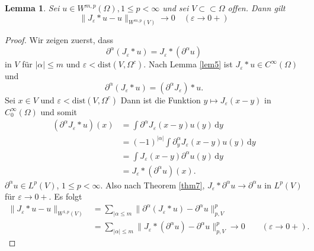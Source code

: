 \documentclass[
paper=a4,
bibtotocnumbered,
liststotocnumbered,
tablecaptionabove,
pointlessnumbers,
twoside,
openright,
10pt
]
{report}
\newtheorem{lem}[thm]{Lemma}
\theoremstyle{definition}
\numberwithin{equation}{chapter}
\begin{document}
\begin{lem}\label{2.6}
Sei $u\in W^{m,p}(\Omega), 1 \le p <\infty$ und sei $V\subset \subset \Omega$ offen. Dann gilt
$$
\| J_\varepsilon * u - u\|_{W^{m,p}(V)} \to 0 \quad (\varepsilon \rightarrow 0 +)
$$
\end{lem}
\begin{proof}
Wir zeigen zuerst, dass
$$
\partial^\alpha (J_\varepsilon * u) = J_\varepsilon * (\partial^\alpha u)
$$
in $V$ für $|\alpha|\le m$ und $\varepsilon < \text{dist} (V, \Omega^c)$. Nach Lemma \ref{lem5} ist $J_\varepsilon * u\in C^\infty(\Omega)$ und 
$$
\partial^\alpha (J_\varepsilon * u) = ( \partial^\alpha J_\varepsilon) * u.
$$
Sei $x\in V$ und $\varepsilon < \text{dist}(V, \Omega^c)$ Dann ist die Funktion 
$y\mapsto J_\varepsilon(x-y)$ in $C_0^\infty(\Omega)$ und somit 
\begin{align*}
(\partial^\alpha J_\varepsilon * u) (x)&= \int \partial^\alpha J_\varepsilon (x-y) u(y) \, \mathrm dy\\
&= (-1)^{|\alpha|} \int \partial_y^\alpha J_{\varepsilon} (x-y) u(y) \, \mathrm dy \\
&= \int J_\varepsilon (x-y) \partial^\alpha u(y) \, \mathrm dy \\
&= J_\varepsilon * (\partial^\alpha u) (x).
\end{align*}
$\partial^\alpha u \in L^p(V)$, $1\le p <\infty$. Also nach Theorem \ref{thm7}, $J_\varepsilon * \partial^\alpha u \to \partial^\alpha u$ in $L^p(V)$  für $\varepsilon \to 0 +$. Es folgt
\begin{align*}
\| J_\varepsilon * u - u \|_{W^{1,p}(V)} &= \sum_{|\alpha \le m} \| \partial^\alpha (J_\varepsilon * u) - \partial^\alpha u \|^p_{p,V}\\
&= \sum_{|\alpha|\le m} \| J_\varepsilon * (\partial^\alpha u) - \partial^\alpha u \|_{p,V}^p \to 0\qquad (\varepsilon \to 0 +).
\end{align*}
\end{proof}
\end{document}
